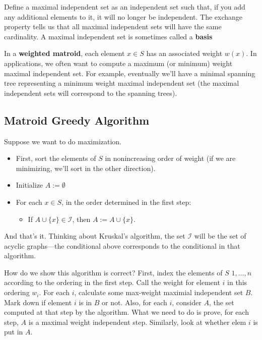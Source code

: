 \documentclass{article}
\begin{document}
Define a maximal independent set as an independent set such that, if you
add any additional elements to it, it will no longer be independent.
The exchange property tells us that all maximal independent sets
will have the same cardinality.
A maximal independent set is sometimes called a \textbf{basis}

In a \textbf{weighted matroid}, each element $x\in S$ has an associated
weight $w(x)$.
In applications, we often want to compute a maximum (or minimum) weight
maximal independent set.
For example, eventually we'll have a minimal spanning tree representing a
minimum weight maximal independent set (the maximal independent sets will
correspond to the spanning trees).




\subsection{Matroid Greedy Algorithm}

Suppose we want to do maximization.
\begin{itemize}

\item
First, sort the elements of $S$ in nonincreasing order of weight (if we
are minimizing, we'll sort in the other direction).

\item
Initialize
$
A := \emptyset
$

\item
For each $x\in S$, in the order determined in the first step:
	\begin{itemize}
		\item
		If $A\cup \{x\} \in \mathcal I$, then $A := A \cup \{x\}$.
	\end{itemize}
\end{itemize}
And that's it.
Thinking about Kruskal's algorithm, the set $\mathcal I$ will be the set
of acyclic graphs---the conditional above corresponds to the conditional
in that algorithm.


How do we show this algorithm is correct?
First, index the elements of $S$ $1,\ldots,n$ according to the
ordering in the first step.
Call the weight for element $i$ in this ordering $w_i$.
For each $i$, calculate some max-weight maximial independent set $B$.
Mark down if element $i$ is in $B$ or not.
Also, for each $i$, consider $A$, the set computed at that step by the algorithm.
What we need to do is prove, for each step, $A$ is a maximal weight independent step.
Similarly, look at whether elem $i$ is put in $A$.
\end{document}

